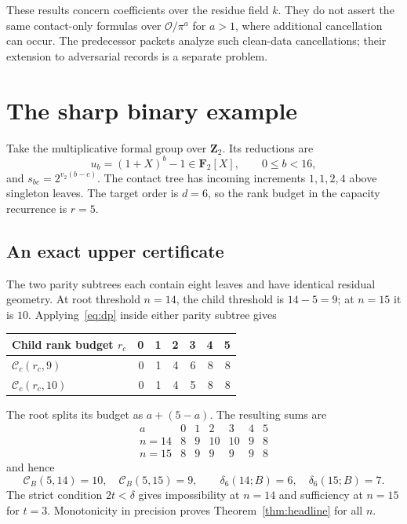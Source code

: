 \documentclass[11pt]{article}
\theoremstyle{definition}
\newcommand{\F}{\mathbf F}
\newcommand{\Z}{\mathbf Z}
\newcommand{\capv}{\mathcal C}
\begin{document}
These results concern coefficients over the residue field $k$. They do not assert the same contact-only formulas over $\mathcal O/\pi^a$ for $a>1$, where additional cancellation can occur. The predecessor packets analyze such clean-data cancellations; their extension to adversarial records is a separate problem.

\section{The sharp binary example}\label{sec:binary}

Take the multiplicative formal group over $\Z_2$. Its reductions are
\[
 u_b=(1+X)^b-1\in\F_2[X],\qquad 0\le b<16,
\]
and $s_{bc}=2^{v_2(b-c)}$. The contact tree has incoming increments $1,1,2,4$ above singleton leaves. The target order is $d=6$, so the rank budget in the capacity recurrence is $r=5$.

\subsection{An exact upper certificate}

The two parity subtrees each contain eight leaves and have identical residual geometry. At root threshold $n=14$, the child threshold is $14-5=9$; at $n=15$ it is $10$. Applying~\eqref{eq:dp} inside either parity subtree gives
\begin{center}
\begin{tabular}{@{}lrrrrrr@{}}
\toprule
Child rank budget $r_c$ & 0&1&2&3&4&5\\
\midrule
$\capv_c(r_c,9)$ &0&1&4&6&8&8\\
$\capv_c(r_c,10)$&0&1&4&5&8&8\\
\bottomrule
\end{tabular}
\end{center}
The root splits its budget as $a+(5-a)$. The resulting sums are
\[
\begin{array}{c|rrrrrr}
 a&0&1&2&3&4&5\\ \hline
 n=14&8&9&10&10&9&8\\
 n=15&8&9&9&9&9&8
\end{array}
\]
and hence
\begin{equation}\label{eq:binarydistance}
 \capv_B(5,14)=10,\quad \capv_B(5,15)=9,
 \qquad \delta_6(14;B)=6,\quad\delta_6(15;B)=7.
\end{equation}
The strict condition $2t<\delta$ gives impossibility at $n=14$ and sufficiency at $n=15$ for $t=3$. Monotonicity in precision proves Theorem~\ref{thm:headline} for all $n$.
\end{document}
